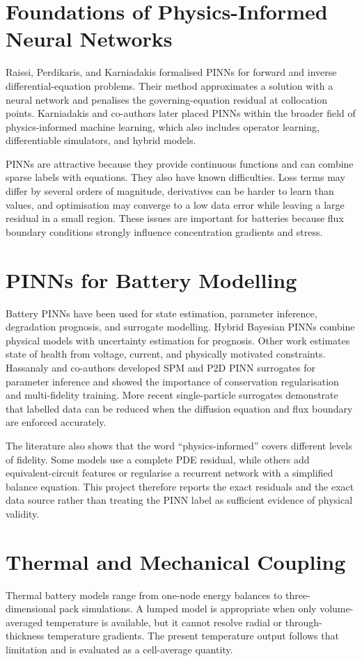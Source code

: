\documentclass[14pt,a4paper,oneside]{extreport}
\begin{document}
\section{Foundations of Physics-Informed Neural Networks}
Raissi, Perdikaris, and Karniadakis formalised PINNs for forward and inverse differential-equation problems. Their method approximates a solution with a neural network and penalises the governing-equation residual at collocation points. Karniadakis and co-authors later placed PINNs within the broader field of physics-informed machine learning, which also includes operator learning, differentiable simulators, and hybrid models.

PINNs are attractive because they provide continuous functions and can combine sparse labels with equations. They also have known difficulties. Loss terms may differ by several orders of magnitude, derivatives can be harder to learn than values, and optimisation may converge to a low data error while leaving a large residual in a small region. These issues are important for batteries because flux boundary conditions strongly influence concentration gradients and stress.

\section{PINNs for Battery Modelling}
\label{sec:lit-third}
Battery PINNs have been used for state estimation, parameter inference, degradation prognosis, and surrogate modelling. Hybrid Bayesian PINNs combine physical models with uncertainty estimation for prognosis. Other work estimates state of health from voltage, current, and physically motivated constraints. Hassanaly and co-authors developed SPM and P2D PINN surrogates for parameter inference and showed the importance of conservation regularisation and multi-fidelity training. More recent single-particle surrogates demonstrate that labelled data can be reduced when the diffusion equation and flux boundary are enforced accurately.

The literature also shows that the word ``physics-informed'' covers different levels of fidelity. Some models use a complete PDE residual, while others add equivalent-circuit features or regularise a recurrent network with a simplified balance equation. This project therefore reports the exact residuals and the exact data source rather than treating the PINN label as sufficient evidence of physical validity.

\section{Thermal and Mechanical Coupling}
\label{sec:lit-fourth}
Thermal battery models range from one-node energy balances to three-dimensional pack simulations. A lumped model is appropriate when only volume-averaged temperature is available, but it cannot resolve radial or through-thickness temperature gradients. The present temperature output follows that limitation and is evaluated as a cell-average quantity.
\end{document}
